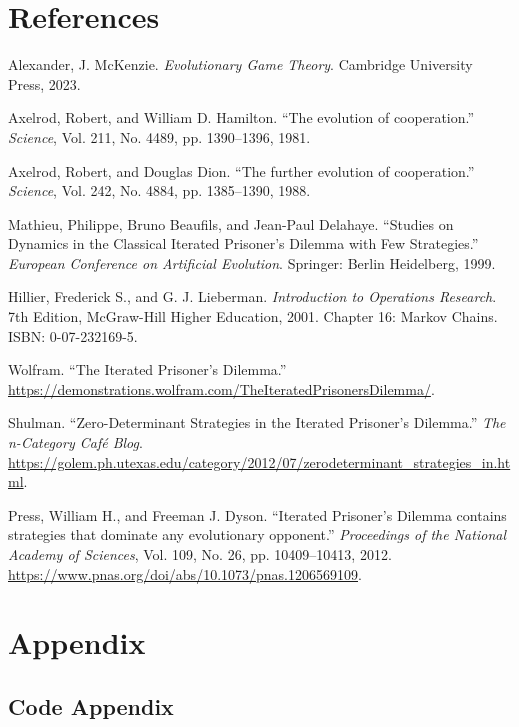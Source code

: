 \documentclass[12pt]{report}
\begin{document}
\chapter{References}
\begin{thebibliography}{9}

Alexander, J. McKenzie.  
\textit{Evolutionary Game Theory}. Cambridge University Press, 2023.

Axelrod, Robert, and William D. Hamilton.  
“The evolution of cooperation.” \textit{Science}, Vol. 211, No. 4489, pp. 1390--1396, 1981.

Axelrod, Robert, and Douglas Dion.  
“The further evolution of cooperation.” \textit{Science}, Vol. 242, No. 4884, pp. 1385--1390, 1988.

Mathieu, Philippe, Bruno Beaufils, and Jean-Paul Delahaye.  
“Studies on Dynamics in the Classical Iterated Prisoner’s Dilemma with Few Strategies.”  
\textit{European Conference on Artificial Evolution}. Springer: Berlin Heidelberg, 1999.

Hillier, Frederick S., and G. J. Lieberman.  
\textit{Introduction to Operations Research}. 7th Edition, McGraw-Hill Higher Education, 2001.  
Chapter 16: Markov Chains. ISBN: 0-07-232169-5.

Wolfram.  
“The Iterated Prisoner's Dilemma.”  
\url{https://demonstrations.wolfram.com/TheIteratedPrisonersDilemma/}.

Shulman.  
“Zero-Determinant Strategies in the Iterated Prisoner's Dilemma.”  
\textit{The n-Category Café Blog}.  
\url{https://golem.ph.utexas.edu/category/2012/07/zerodeterminant_strategies_in.html}.

Press, William H., and Freeman J. Dyson.  
“Iterated Prisoner’s Dilemma contains strategies that dominate any evolutionary opponent.”  
\textit{Proceedings of the National Academy of Sciences}, Vol. 109, No. 26, pp. 10409--10413, 2012.  
\url{https://www.pnas.org/doi/abs/10.1073/pnas.1206569109}.

\end{thebibliography}

\chapter{Appendix}
\section{Code Appendix}
\end{document}
